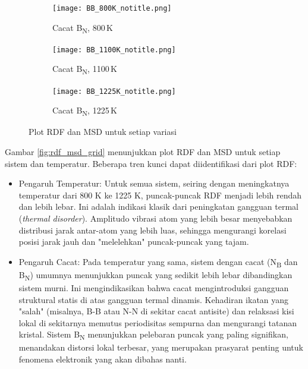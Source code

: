 \begin{figure}[htbp]\ContinuedFloat
  \centering
  \begin{subfigure}{0.9\textwidth}
    \centering
    \texttt{[image: BB\_800K\_notitle.png]}
    \caption{Cacat B\textsubscript{N}, 800 K}
    \label{subfig:rdf_msd_bb_800k}
  \end{subfigure}
  \vspace{1em}
  \begin{subfigure}{0.9\textwidth}
    \centering
    \texttt{[image: BB\_1100K\_notitle.png]}
    \caption{Cacat B\textsubscript{N}, 1100 K}
    \label{subfig:rdf_msd_bb_1100k}
  \end{subfigure}
  \vspace{1em}
  \begin{subfigure}{0.9\textwidth}
    \centering
    \texttt{[image: BB\_1225K\_notitle.png]}
    \caption{Cacat B\textsubscript{N}, 1225 K}
    \label{subfig:rdf_msd_bb_1225k}
  \end{subfigure}
    \caption{Plot RDF dan MSD untuk setiap variasi}
\end{figure}

Gambar \ref{fig:rdf_msd_grid} menunjukkan plot RDF dan MSD untuk setiap sistem dan temperatur.
Beberapa tren kunci dapat diidentifikasi dari plot RDF:
\begin{itemize}
    \item Pengaruh Temperatur: Untuk semua sistem, seiring dengan meningkatnya temperatur dari 800 K ke 1225 K, puncak-puncak RDF menjadi lebih rendah dan lebih lebar.
Ini adalah indikasi klasik dari peningkatan gangguan termal (\emph{thermal disorder}).
Amplitudo vibrasi atom yang lebih besar menyebabkan distribusi jarak antar-atom yang lebih luas, sehingga mengurangi korelasi posisi jarak jauh dan "melelehkan" puncak-puncak yang tajam.
\item Pengaruh Cacat: Pada temperatur yang sama, sistem dengan cacat (N\textsubscript{B} dan B\textsubscript{N}) umumnya menunjukkan puncak yang sedikit lebih lebar dibandingkan sistem murni.
Ini mengindikasikan bahwa cacat mengintroduksi gangguan struktural statis di atas gangguan termal dinamis.
Kehadiran ikatan yang "salah" (misalnya, B-B atau N-N di sekitar cacat antisite) dan relaksasi kisi lokal di sekitarnya memutus periodisitas sempurna dan mengurangi tatanan kristal.
Sistem B\textsubscript{N} menunjukkan pelebaran puncak yang paling signifikan, menandakan distorsi lokal terbesar, yang merupakan prasyarat penting untuk fenomena elektronik yang akan dibahas nanti.
\end{itemize}

